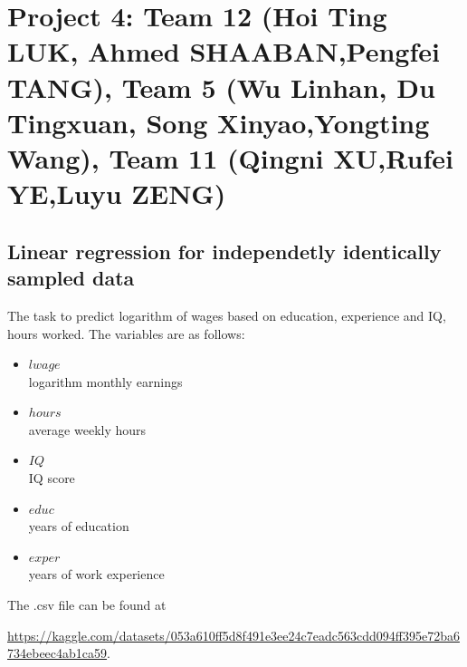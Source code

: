 \documentclass{article}
\begin{document}
\section*{Project 4: Team 12 (Hoi Ting LUK, Ahmed SHAABAN,Pengfei TANG),  Team 5 (Wu Linhan, Du Tingxuan, Song Xinyao,Yongting Wang), Team 11 (Qingni XU,Rufei YE,Luyu ZENG)}


 \subsection*{Linear regression for independetly identically sampled data}
   The task to predict logarithm of wages based on education, experience and IQ, hours worked. The variables are as follows:
   \begin{itemize}
   \item{$lwage$ \\}                    logarithm monthly earnings
   \item{$hours$ \\}                    average weekly hours
   \item{$IQ$ \\}                      IQ score
   \item{$educ$ \\}                     years of education
   \item{$exper$ \\}                    years of work experience
   \end{itemize}


   The .csv file can be found at 

   \url{https://kaggle.com/datasets/053a610ff5d8f491e3ee24c7eadc563cdd094ff395e72ba6734ebeec4ab1ca59}. %
\end{document}
